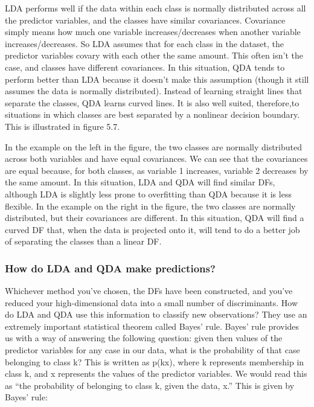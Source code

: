 \documentclass[
]{article}
\begin{document}
LDA performs well if the data within each class is normally distributed
across all the predictor variables, and the classes have similar
covariances. Covariance simply means how much one variable
increases/decreases when another variable increases/decreases. So LDA
assumes that for each class in the dataset, the predictor variables
covary with each other the same amount. This often isn't the case, and
classes have different covariances. In this situation, QDA tends to
perform better than LDA because it doesn't make this assumption (though
it still assumes the data is normally distributed). Instead of learning
straight lines that separate the classes, QDA learns curved lines. It is
also well suited, therefore,to situations in which classes are best
separated by a nonlinear decision boundary. This is illustrated in
figure 5.7.

In the example on the left in the figure, the two classes are normally
distributed across both variables and have equal covariances. We can see
that the covariances are equal because, for both classes, as variable 1
increases, variable 2 decreases by the same amount. In this situation,
LDA and QDA will find similar DFs, although LDA is slightly less prone
to overfitting than QDA because it is less flexible. In the example on
the right in the figure, the two classes are normally distributed, but
their covariances are different. In this situation, QDA will find a
curved DF that, when the data is projected onto it, will tend to do a
better job of separating the classes than a linear DF.

\subsubsection{How do LDA and QDA make
predictions?}\label{how-do-lda-and-qda-make-predictions}

Whichever method you've chosen, the DFs have been constructed, and
you've reduced your high-dimensional data into a small number of
discriminants. How do LDA and QDA use this information to classify new
observations? They use an extremely important statistical theorem called
Bayes' rule. Bayes' rule provides us with a way of answering the
following question: given then values of the predictor variables for any
case in our data, what is the probability of that case belonging to
class k? This is written as p(k\textbar x), where k represents
membership in class k, and x represents the values of the predictor
variables. We would read this as ``the probability of belonging to class
k, given the data, x.'' This is given by Bayes' rule:
\end{document}
